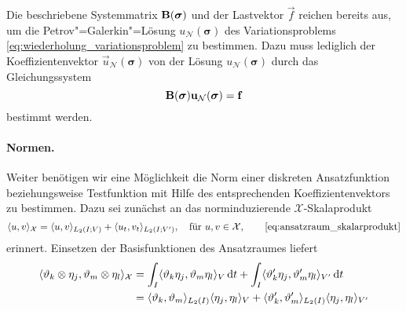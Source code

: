 \documentclass[../main.tex]{subfiles}
\begin{document}
Die beschriebene Systemmatrix $\mathbf{B}(\bm \sigma)$ und der Lastvektor $\vec f$ reichen bereits aus, um die Petrov"=Galerkin"=Lösung $u_{\mathcal N}(\bm \sigma)$ des Variationsproblems \cref{eq:wiederholung_variationsproblem} zu bestimmen.
Dazu muss lediglich der Koeffizientenvektor $\vec{u}_{\mathcal N}(\bm \sigma)$ von der Lösung $u_{\mathcal N}(\bm \sigma)$ durch das Gleichungssystem
\begin{equation}
    \mathbf{B}(\bm \sigma) \mathbf{u}_{\mathcal N}(\bm \sigma) = \mathbf{f}
\end{equation}
bestimmt werden.

\paragraph{Normen.} %
\label{par:normen}

Weiter benötigen wir eine Möglichkeit die Norm einer diskreten Ansatzfunktion beziehungsweise Testfunktion mit Hilfe des entsprechenden Koeffizientenvektors zu bestimmen.
Dazu sei zunächst an das norminduzierende $\mathcal X$-Skalaprodukt
\begin{equation}
    \skp{u}{v}{\mathcal X} = \skp{u}{v}{L_{2}(I; V)} + \skp{u_t}{v_t}{L_2(I; V')}, \quad \text{für } u, v \in \mathcal X, \tag*{\cref{eq:ansatzraum_skalarprodukt}}
\end{equation}
erinnert.
Einsetzen der Basisfunktionen des Ansatzraumes liefert
\begin{align}
    \langle\vartheta_{k} \otimes \eta_{j},\vartheta_{m} \otimes \eta_{l}\rangle_{\mathcal X}
    &= \int_{I} \langle\vartheta_{k} \eta_{j},\vartheta_{m} \eta_{l}\rangle_{V} \mathop{}\!\mathrm{d} t
        + \int_{I} \langle\vartheta_{k}' \eta_{j},\vartheta_{m}' \eta_{l}\rangle_{V'} \mathop{}\!\mathrm{d} t
    \\&= \langle\vartheta_{k},\vartheta_{m}\rangle_{L_{2}(I)} \langle\eta_{j},\eta_{l}\rangle_{V} + \langle\vartheta_{k}',\vartheta_{m}'\rangle_{L_{2}(I)} \langle\eta_{j},\eta_{l}\rangle_{V'}
\end{align}
\end{document}
